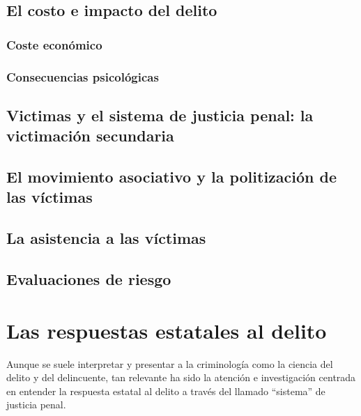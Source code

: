 \documentclass[
  spanish,
  letterpaper,
  DIV=11,
  numbers=noendperiod]{scrreprt}
\begin{document}
\section{El costo e impacto del
delito}\label{el-costo-e-impacto-del-delito}

\subsection{Coste económico}\label{coste-econuxf3mico}

\subsection{Consecuencias
psicológicas}\label{consecuencias-psicoluxf3gicas}

\section{Victimas y el sistema de justicia penal: la victimación
secundaria}\label{victimas-y-el-sistema-de-justicia-penal-la-victimaciuxf3n-secundaria}

\section{El movimiento asociativo y la politización de las
víctimas}\label{el-movimiento-asociativo-y-la-politizaciuxf3n-de-las-vuxedctimas}

\section{La asistencia a las
víctimas}\label{la-asistencia-a-las-vuxedctimas}

\section{Evaluaciones de riesgo}\label{evaluaciones-de-riesgo}

\chapter{Las respuestas estatales al
delito}\label{las-respuestas-estatales-al-delito}

Aunque se suele interpretar y presentar a la criminología como la
ciencia del delito y del delincuente, tan relevante ha sido la atención
e investigación centrada en entender la respuesta estatal al delito a
través del llamado ``sistema'' de justicia penal.
\end{document}
